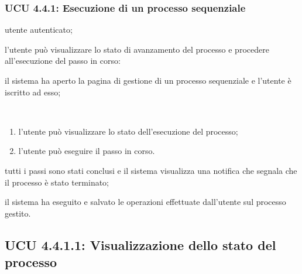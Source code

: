 \subsubsection{UCU 4.4.1: Esecuzione di un processo sequenziale}
\begin{description}[leftmargin=0cm]
\item[Attori:] utente autenticato;
\item[Descrizione:] l'utente può visualizzare lo stato di avanzamento del processo e procedere all'esecuzione del passo in corso:
\item[Precondizione:] il sistema ha aperto la pagina di gestione di un processo sequenziale e l'utente è iscritto ad esso;
\item[Scenario principale:]\
\begin{enumerate}
\item l'utente può visualizzare lo stato dell'esecuzione del processo;
\item l'utente può eseguire il passo in corso.
\end{enumerate}
\item[Scenario alternativo:] tutti i passi sono stati conclusi e il sistema visualizza una notifica che segnala che il processo è stato terminato; 
\item[Postcondizione:] il sistema ha eseguito e salvato le operazioni effettuate dall'utente sul processo gestito.
\end{description}

\subsection{UCU 4.4.1.1: Visualizzazione dello stato del processo}

